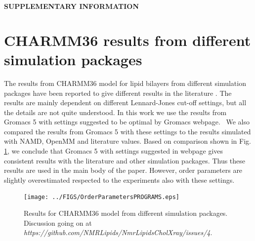 \documentclass[aps,prl,superscriptaddress,twocolumn]{revtex4}
\begin{document}
%

\begin{acknowledgments}
\end{acknowledgments}
\newpage
\appendix
\begin{center}
{\bf SUPPLEMENTARY INFORMATION}
\end{center}
\section{CHARMM36 results from different simulation packages}
The results from CHARMM36 model for lipid bilayers from different 
simulation packages have been reported to give different results in
the literature \cite{piggot12,lee16}. The results are mainly
dependent on different Lennard-Jones cut-off settings, but
all the details are not quite understood. In this work we use
the results from Gromacs 5 with settings suggested to be optimal
by Gromacs webpage.~ We also compared the results from Gromacs 5 with
these settings to the results simulated with NAMD, OpenMM and literature
values. Based on comparison shown in Fig. \ref{programsCOMP}, we conclude
that Gromacs 5 with settings suggested in webpage gives consistent
results with the literature and other simulation packages. Thus these
results are used in the main body of the paper. However, order parameters
are slightly overestimated respected to the experiments also with these
settings. \\
 \begin{figure}[]
  \centering
  \texttt{[image: ../FIGS/OrderParametersPROGRAMS.eps]}

  \caption{\label{programsCOMP}
    Results for CHARMM36 model \cite{klauda10} from different simulation packages.
    Discussion going on at {\it https://github.com/NMRLipids/NmrLipidsCholXray/issues/4}.
  }
\end{figure}




\listoftodos
\end{document}
